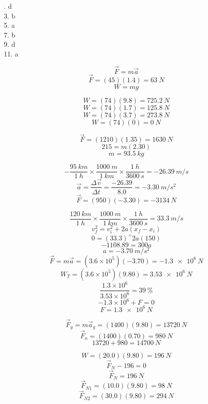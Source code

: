 \documentclass[11pt]{homework}
\begin{document}
\maketitle

\renewcommand{\questiontype}{MisConcQ}
\setcounter{questionCounter}{0}

.  d\\
3.  b\\ 
5.  a\\
7.  b\\
9.  d\\
11. a

\renewcommand{\questiontype}{Problem}
\setcounter{questionCounter}{0}

\question
\[
\vec{F}=m\vec{a}
\] \[
\vec{F}=(45)(1.4) = \boxed{\qty{63}{N}}
\] 
\question
\[
W = mg
\] 
\begin{alphaparts}
    \questionpart
    \[
    W = (74)(9.8) = \boxed{\qty{725.2}{N}}
    \] 
    \questionpart
    \[
    W = (74)(1.7) = \boxed{\qty{125.8}{N}}
    \] 
    \questionpart
    \[
    W = (74)(3.7) = \boxed{\qty{273.8}{N}}
    \] 
    \questionpart
    \[
    W = (74)(0) = \boxed{\qty{0}{N}}
    \] 
\end{alphaparts}

\question
\[
\vec{F}=(1210)(1.35)=\boxed{\qty{1630}{N}}
\] 
\question
\[
215 = m(2.30)
\] \[
m = \boxed{\qty{93.5}{kg}}
\] 

\question
\[
    -\frac{\qty{95}{km}}{\qty{1}{h}} \times \frac{\qty{1000}{m}}{\qty{1}{km}} \times \frac{\qty{1}{h}}{\qty{3600}{s}} = \qty{-26.39}{m/s}
\] 
\[
    \vec{a} = \frac{\Delta \vec{v}}{\Delta t} = \frac{-26.39}{8.0} = \qty{-3.30}{m/s^2}
\]  \[
\vec{F} = (950)(-3.30) = \boxed{\qty{-3134}{N}}
\] 

\setcounter{questionCounter}{6}
\question
\[
    \frac{\qty{120}{km}}{\qty{1}{h}}\times \frac{\qty{1000}{m}}{\qty{1}{km}} \times \frac{\qty{1}{h}}{\qty{3600}{s}} = \qty{33.3}{m/s}
\]\[
v_{f}^2=v_{i}^2 +2a(x_f-x_i)
\] \[
0=(33.3)^+2a(150)
\] \[
-1108.89 = 300a
\] \[
a = \qty{-3.70}{m/s^2}
\] 
\[
    \vec{F}=m\vec{a}=(3.6\times 10^5)(-3.70)=\boxed{\SI{-1.3e6}{N}}
\] \[
W_T = (3.6 \times 10^5)(9.80) = \SI{3.53e6}{N}
\] \[
\frac{1.3 \times 10^6}{3.53 \times 10^6} = \boxed{\SI{39}{\percent}}
\] \[
-1.3 \times 10^6 + F = 0
\] \[
F = \boxed{\SI{1.3e6}{N}}
\] 

\setcounter{questionCounter}{11}
\question
\[
    \vec{F}_g=m\vec{a}_g=(1400)(9.80) = \qty{13720}{N}
\] \[
\vec{F}_a =(1400)(0.70)=\qty{980}{N}
\] \[
13720 + 980 = \boxed{\qty{14700}{N}}
\]
\question
\begin{alphaparts}
    \questionpart
        \[
            W = (20.0)(9.80) = \boxed{\qty{196}{N}}
        \]\[
            \vec{F}_N - 196 = 0
            \]\[
            \vec{F}_N = \boxed{\qty{196}{N}}
        \]
    \questionpart
        \[
            \vec{F}_{N1} = (10.0)(9.80)=\boxed{\qty{98}{N}}
        \] \[
        \vec{F}_{N2}=(30.0)(9.80)=\boxed{\qty{294}{N}}
        \] 
\end{alphaparts}
\end{document}
